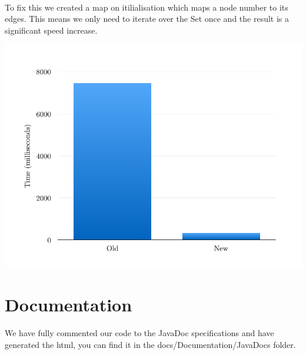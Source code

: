 \documentclass[a4paper, 12pt]{article}
\begin{document}
\\
To fix this we created a map on itilialisation which maps a node number to its edges. This means we only need to iterate over the Set once and the result is a significant speed increase.\\
\centerline{
\includegraphics[width = 14cm]{comparison}\\
}
\section{Documentation}
We have fully commented our code to the JavaDoc specifications and have generated the html, you can find it in the docs/Documentation/JavaDocs folder.
\end{document}
